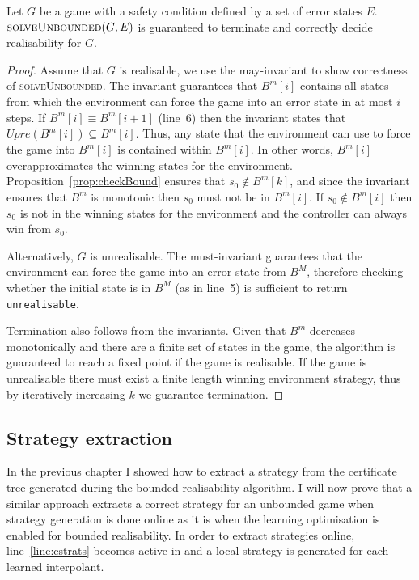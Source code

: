 \begin{theorem}
    Let $G$ be a game with a safety condition defined by a set of error states $E$.  $\textsc{solveUnbounded}(G, E)$ is guaranteed to terminate and correctly decide realisability for $G$.
\end{theorem}
\begin{proof}
Assume that $G$ is realisable, we use the may-invariant to show correctness of \textsc{solveUnbounded}.  The invariant guarantees that $B^m[i]$ contains all states from which the environment can force the game into an error state in at most $i$ steps. If $B^m[i] \equiv B^m[i+1]$ (line~6) then the invariant states that $Upre(B^m[i]) \subseteq B^m[i]$. Thus, any state that the environment can use to force the game into $B^m[i]$ is contained within $B^m[i]$. In other words, $B^m[i]$ overapproximates the winning states for the environment.  Proposition~\ref{prop:checkBound} ensures that $s_0 \not\in B^m[k]$, and since the invariant ensures that $B^m$ is monotonic then $s_0$ must not be in $B^m[i]$. If $s_0 \not\in B^m[i]$ then $s_0$ is not in the winning states for the environment and the controller can always win from $s_0$.  

Alternatively, $G$ is unrealisable. The must-invariant guarantees that the environment can force the game into an error state from $B^M$, therefore checking whether the initial state is in $B^M$ (as in line~5) is sufficient to return \texttt{unrealisable}.  

Termination also follows from the invariants. Given that $B^m$ decreases monotonically and there are a finite set of states in the game, the algorithm is guaranteed to reach a fixed point if the game is realisable. If the game is unrealisable there must exist a finite length winning environment strategy, thus by iteratively increasing $k$ we guarantee termination.

\end{proof}

\subsection{Strategy extraction}

In the previous chapter I showed how to extract a strategy from the certificate tree generated during the bounded realisability algorithm. I will now prove that a similar approach extracts a correct strategy for an unbounded game when strategy generation is done online as it is when the learning optimisation is enabled for bounded realisability. In order to extract strategies online, line~\ref{line:cstrats} becomes active in  and a local strategy is generated for each learned interpolant.

